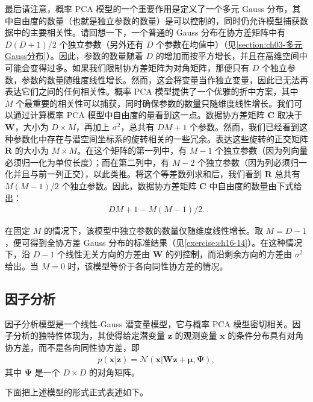 \documentclass[../../main.tex]{subfiles}
\begin{document}
最后请注意，概率 PCA 模型的一个重要作用是定义了一个多元 Gauss 分布，其中自由度的数量（也就是独立参数的数量）是可以控制的，同时仍允许模型捕获数据中的主要相关性。请回想一下，一个普通的 Gauss 分布在协方差矩阵中有 $D(D+1)/2$ 个独立参数（另外还有 $D$ 个参数在均值中）（见\cref{section:ch03-多元Gauss分布}）。因此，参数的数量随着 $D$ 的增加而按平方增长，并且在高维空间中可能会变得过多。如果我们限制协方差矩阵为对角矩阵，那便只有 $D$ 个独立参数，参数的数量随维度线性增长。然而，这会将变量当作独立变量，因此已无法再表达它们之间的任何相关性。概率 PCA 模型提供了一个优雅的折中方案，其中 $M$ 个最重要的相关性可以捕获，同时确保参数的数量只随维度线性增长。我们可以通过计算概率 PCA 模型中自由度的量看到这一点。数据协方差矩阵 $\bm{C}$ 取决于 $\bm{W}$，大小为 $D\times M$，再加上 $\sigma^2$，总共有 $DM+1$ 个参数。然而，我们已经看到这种参数化中存在与潜空间坐标系的旋转相关的一些冗余。表达这些旋转的正交矩阵 $\bm{R}$ 的大小为 $M\times M$。在这个矩阵的第一列中，有 $M-1$ 个独立参数（因为列向量必须归一化为单位长度）；而在第二列中，有 $M-2$ 个独立参数（因为列必须归一化并且与前一列正交），以此类推。将这个等差数列求和后，我们看到 $\bm{R}$ 总共有 $M(M-1)/2$ 个独立参数。因此，数据协方差矩阵 $\bm{C}$ 中自由度的数量由下式给出：
\begin{align}
  DM+1-M(M-1)/2.
  \label{align:ch16-参数计数}
\end{align}

在固定 $M$ 的情况下，该模型中独立参数的数量仅随维度线性增长。取 $M=D-1$，便可得到全协方差 Gauss 分布的标准结果（见\cref{exercise:ch16-14}）。在这种情况下，沿 $D-1$ 个线性无关方向的方差由 $\bm{W}$ 的列控制，而沿剩余方向的方差由 $\sigma^2$ 给出。当 $M=0$ 时，该模型等价于各向同性协方差的情况。

\subsection{因子分析}\label{subsection:ch16-因子分析}

因子分析模型是一个线性-Gauss 潜变量模型，它与概率 PCA 模型密切相关。因子分析的独特性体现为，其使得给定潜变量 $\bm{z}$ 的观测变量 $\bm{x}$ 的条件分布具有对角协方差，而不是各向同性协方差，即
\begin{align}
  p(\bm{x}|\bm{z})=\mathcal{N}(\bm{x}|\bm{W}\bm{z}+\bm{\mu},\bm{\Psi}),
  \label{align:ch16-因子条件}
\end{align}
其中 $\bm{\Psi}$ 是一个 $D\times D$ 的对角矩阵。

下面把上述模型的形式正式表述如下。
\end{document}
